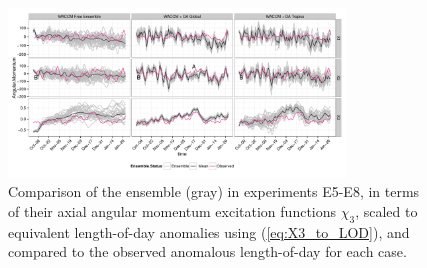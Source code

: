 \begin{figure}
	 \includegraphics[width=0.8\textwidth]{Paper_figures/ERPDA_paper_evalvariable_aam_space.pdf}
	 \caption{Comparison of the ensemble (gray) in experiments E5-E8, in terms of their axial angular momentum excitation functions $\chi_3$, scaled to equivalent length-of-day anomalies using (\ref{eq:X3_to_LOD}), and compared to the observed anomalous length-of-day for each case.}
	 \label{fig:evalvariable_aam}
\end{figure}





